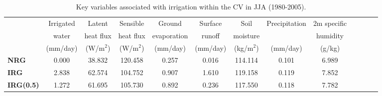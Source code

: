 \begin{table}
\begin{center}
\caption{Key variables associated with irrigation within the CV in JJA (1980-2005).} \label{tab:table2}
\begin{tabular*}{7.5in}{l @{\extracolsep{\fill}}cccccccccccc}
\hline & Irrigated & Latent & Sensible & Ground & Surface & Soil & Precipitation & 2m specific \\ 
& water & heat flux & heat flux & evaporation & runoff & moisture & & humidity \\ 
& (mm/day) & (W/m$^2$) & (W/m$^2$) & (mm/day) & (mm/day) & (kg/m$^2$) & (mm/day) & (g/kg) \\ 
\hline \textbf{NRG} & 0.000 & 38.832 & 120.458 & 0.257 & 0.016 & 114.114 & 0.101 & 6.989 \\  
\textbf{IRG} & 2.838 & 62.574 & 104.752 & 0.907 & 1.610 & 119.158 & 0.119 & 7.852 \\ 
\textbf{IRG(0.5)} & 1.272 & 61.695 & 105.730 & 0.892 & 0.236 & 117.550 & 0.118 & 7.782 \\ 
\hline
\end{tabular*}
\end{center}
\end{table}

